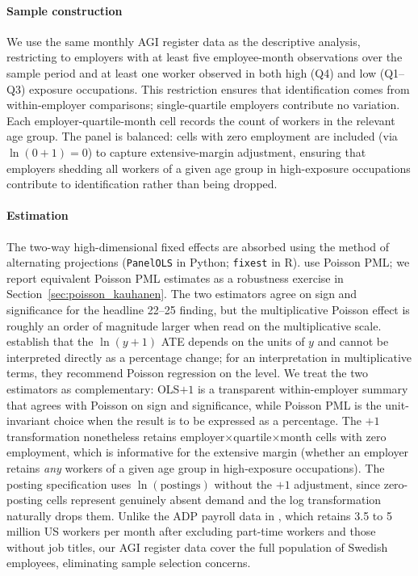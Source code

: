 \documentclass[preprint,12pt,authoryear]{elsarticle}
\begin{document}
\paragraph{Sample construction}
We use the same monthly AGI register data as the descriptive analysis, restricting to employers with at least five employee-month observations over the sample period and at least one worker observed in both high (Q4) and low (Q1--Q3) exposure occupations. This restriction ensures that identification comes from within-employer comparisons; single-quartile employers contribute no variation. Each employer-quartile-month cell records the count of workers in the relevant age group. The panel is balanced: cells with zero employment are included (via $\ln(0+1)=0$) to capture extensive-margin adjustment, ensuring that employers shedding all workers of a given age group in high-exposure occupations contribute to identification rather than being dropped.

\paragraph{Estimation}
The two-way high-dimensional fixed effects are absorbed using the method of alternating projections (\texttt{PanelOLS} in Python; \texttt{fixest} in R). \citet{brynjolfsson2025canaries} use Poisson PML; we report equivalent Poisson PML estimates as a robustness exercise in Section~\ref{sec:poisson_kauhanen}. The two estimators agree on sign and significance for the headline 22--25 finding, but the multiplicative Poisson effect is roughly an order of magnitude larger when read on the multiplicative scale. \citet{chen2024logs} establish that the $\ln(y+1)$ ATE depends on the units of $y$ and cannot be interpreted directly as a percentage change; for an interpretation in multiplicative terms, they recommend Poisson regression on the level. We treat the two estimators as complementary: OLS$+1$ is a transparent within-employer summary that agrees with Poisson on sign and significance, while Poisson PML is the unit-invariant choice when the result is to be expressed as a percentage. The $+1$ transformation nonetheless retains employer$\times$quartile$\times$month cells with zero employment, which is informative for the extensive margin (whether an employer retains \emph{any} workers of a given age group in high-exposure occupations). The posting specification uses $\ln(\text{postings})$ without the $+1$ adjustment, since zero-posting cells represent genuinely absent demand and the log transformation naturally drops them. Unlike the ADP payroll data in \citet{brynjolfsson2025canaries}, which retains 3.5 to 5 million US workers per month after excluding part-time workers and those without job titles, our AGI register data cover the full population of Swedish employees, eliminating sample selection concerns.
\end{document}
